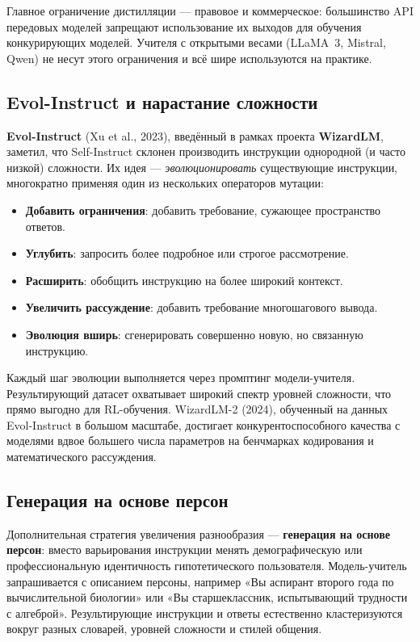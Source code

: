 Главное ограничение дистилляции --- правовое и коммерческое: большинство API передовых моделей запрещают использование их выходов для обучения конкурирующих моделей. Учителя с открытыми весами (LLaMA~3, Mistral, Qwen) не несут этого ограничения и всё шире используются на практике.

\subsection{Evol-Instruct и нарастание сложности}

\textbf{Evol-Instruct} (Xu et al., 2023), введённый в рамках проекта \textbf{WizardLM}, заметил, что Self-Instruct склонен производить инструкции однородной (и часто низкой) сложности. Их идея --- \emph{эволюционировать} существующие инструкции, многократно применяя один из нескольких операторов мутации:

\begin{itemize}[leftmargin=*]
  \item \textbf{Добавить ограничения}: добавить требование, сужающее пространство ответов.
  \item \textbf{Углубить}: запросить более подробное или строгое рассмотрение.
  \item \textbf{Расширить}: обобщить инструкцию на более широкий контекст.
  \item \textbf{Увеличить рассуждение}: добавить требование многошагового вывода.
  \item \textbf{Эволюция вширь}: сгенерировать совершенно новую, но связанную инструкцию.
\end{itemize}

Каждый шаг эволюции выполняется через промптинг модели-учителя. Результирующий датасет охватывает широкий спектр уровней сложности, что прямо выгодно для RL-обучения. WizardLM-2 (2024), обученный на данных Evol-Instruct в большом масштабе, достигает конкурентоспособного качества с моделями вдвое большего числа параметров на бенчмарках кодирования и математического рассуждения.

\subsection{Генерация на основе персон}

Дополнительная стратегия увеличения разнообразия --- \textbf{генерация на основе персон}: вместо варьирования инструкции менять демографическую или профессиональную идентичность гипотетического пользователя. Модель-учитель запрашивается с описанием персоны, например «Вы аспирант второго года по вычислительной биологии» или «Вы старшеклассник, испытывающий трудности с алгеброй». Результирующие инструкции и ответы естественно кластеризуются вокруг разных словарей, уровней сложности и стилей общения.

